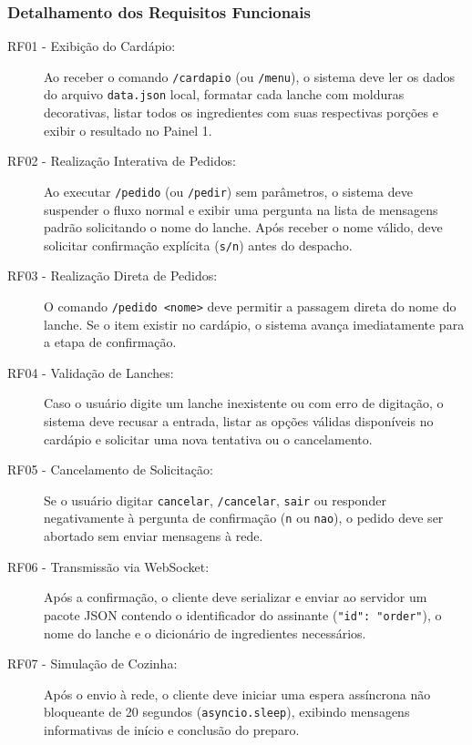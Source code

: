 \documentclass[12pt]{article}
\begin{document}
\subsubsection{Detalhamento dos Requisitos Funcionais}

\begin{description}
    \item[RF01 - Exibição do Cardápio:] Ao receber o comando \texttt{/cardapio} (ou \texttt{/menu}), o sistema deve ler os dados do arquivo \texttt{data.json} local, formatar cada lanche com molduras decorativas, listar todos os ingredientes com suas respectivas porções e exibir o resultado no Painel 1.
    
    \item[RF02 - Realização Interativa de Pedidos:] Ao executar \texttt{/pedido} (ou \texttt{/pedir}) sem parâmetros, o sistema deve suspender o fluxo normal e exibir uma pergunta na lista de mensagens padrão solicitando o nome do lanche. Após receber o nome válido, deve solicitar confirmação explícita (\texttt{s/n}) antes do despacho.
    
    \item[RF03 - Realização Direta de Pedidos:] O comando \texttt{/pedido <nome>} deve permitir a passagem direta do nome do lanche. Se o item existir no cardápio, o sistema avança imediatamente para a etapa de confirmação.
    
    \item[RF04 - Validação de Lanches:] Caso o usuário digite um lanche inexistente ou com erro de digitação, o sistema deve recusar a entrada, listar as opções válidas disponíveis no cardápio e solicitar uma nova tentativa ou o cancelamento.
    
    \item[RF05 - Cancelamento de Solicitação:] Se o usuário digitar \texttt{cancelar}, \texttt{/cancelar}, \texttt{sair} ou responder negativamente à pergunta de confirmação (\texttt{n} ou \texttt{nao}), o pedido deve ser abortado sem enviar mensagens à rede.

    \item[RF06 - Transmissão via WebSocket:] Após a confirmação, o cliente deve serializar e enviar ao servidor um pacote JSON contendo o identificador do assinante (\texttt{"id": "order"}), o nome do lanche e o dicionário de ingredientes necessários.

    \item[RF07 - Simulação de Cozinha:] Após o envio à rede, o cliente deve iniciar uma espera assíncrona não bloqueante de 20 segundos (\texttt{asyncio.sleep}), exibindo mensagens informativas de início e conclusão do preparo.


\end{description}
\end{document}
